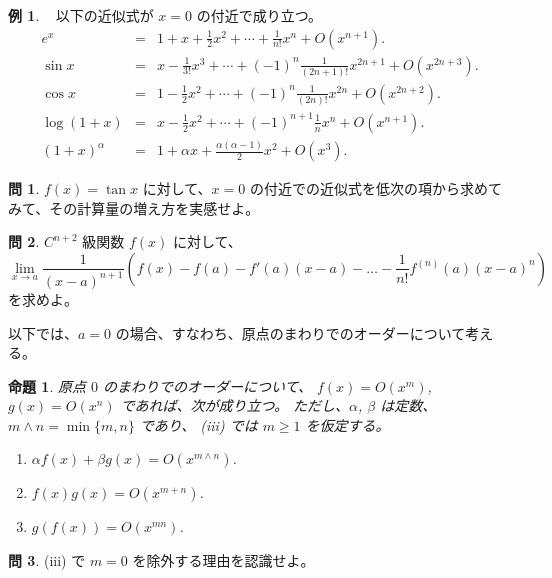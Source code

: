\documentclass[a4paper]{jsarticle}
\newtheorem{Proposition}[Theorem]{命題}
\theoremstyle{definition}
\newtheorem{Example}[Theorem]{例}
\newtheorem{Exercise}{問}%
\theoremstyle{remark}
\begin{document}
\begin{Example}~ 
以下の近似式が $x=0$ の付近で成り立つ。
\begin{eqnarray*}
e^x &=& 1 + x + \frac{1}{2}x^2 + \cdots + \frac{1}{n!}x^n + O(x^{n+1}).\\
\sin x &=& x - \frac{1}{3!}x^3 + \cdots +
(-1)^n\frac{1}{(2n+1)!}x^{2n+1}
+ O(x^{2n+3}).\\
\cos x &=& 1 - \frac{1}{2}x^2 + \cdots + (-1)^n\frac{1}{(2n)!}x^{2n}
+ O(x^{2n+2}).\\
\log(1+x) &=& x - \frac{1}{2}x^2 + \cdots + (-1)^{n+1} \frac{1}{n} x^n + O(x^{n+1}).\\
(1+x)^\alpha &=& 1 + \alpha x + \frac{\alpha(\alpha-1)}{2}x^2 + O(x^3). 
\end{eqnarray*}
\end{Example}

\begin{Exercise}
$f(x) = \tan x$ に対して、$x=0$ の付近での近似式を低次の項から求めてみて、その計算量の増え方を実感せよ。
\end{Exercise}

\begin{Exercise}
$C^{n+2}$ 級関数 $f(x)$ に対して、
\[
\lim_{x \to a} 
\frac{1}{(x-a)^{n+1}} 
\left(
f(x) - f(a) - f'(a)(x-a) - \dots - \frac{1}{n!} f^{(n)}(a)(x-a)^n 
\right) 
\]
を求めよ。
\end{Exercise}

以下では、$a=0$ の場合、すなわち、原点のまわりでのオーダーについて考える。

\begin{Proposition} 原点 $0$ のまわりでのオーダーについて、
$f(x) = O(x^m)$, $g(x) = O(x^n)$ であれば、次が成り立つ。
ただし、$\alpha$, $\beta$ は定数、$m \wedge n = \min \{ m,n\}$ であり、
(iii) では $m \geq 1$ を仮定する。
\begin{enumerate}
\item
$\alpha f(x) + \beta g(x) = O(x^{m \wedge n})$. 
\item 
$f(x)g(x) = O(x^{m+n})$. 
\item
$g(f(x)) = O(x^{mn})$. 
\end{enumerate}
\end{Proposition} 

\begin{Exercise}
(iii) で $m=0$ を除外する理由を認識せよ。%
\end{Exercise}
\end{document}
